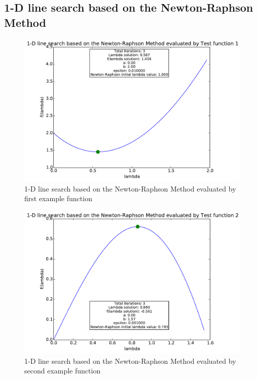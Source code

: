\documentclass[a4paper,10pt]{article}
\begin{document}
\subsection{1-D line search based on the Newton-Raphson Method}
\begin{figure}[h]
\centering
 \includegraphics[scale=0.55]{./graphs/algorithm1/x_in_middel/testFunction1.pdf} 
 \caption{1-D line search based on the Newton-Raphson Method evaluated by first example function}
 \label{fig:alg1test1}
\end{figure}

\begin{figure}[h]
\centering
 \includegraphics[scale=0.55]{./graphs/algorithm1/x_in_middel/testFunction2.pdf} 
 \caption{1-D line search based on the Newton-Raphson Method evaluated by second example function}
 \label{fig:alg1test2}
\end{figure}
\end{document}
